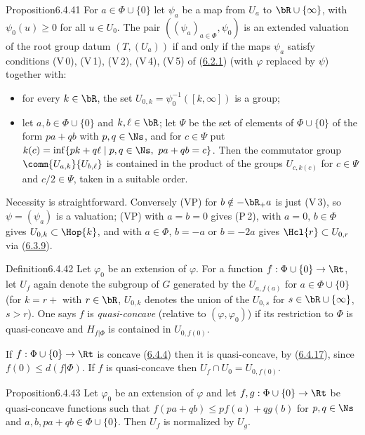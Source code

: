 \documentclass[12pt,a4paper,oneside,english]{smfart}
\makeatletter
\newcommand{\btanchor}[1]{\leavevmode\Hy@raisedlink{\hypertarget{bt:#1}{}}}
\newcommand{\btref}[1]{\hyperlink{bt:#1}{#1}}
\theoremstyle{definition}
\theoremstyle{bt}
\makeatother
\begin{document}
\begin{bt}{Proposition}{6.4.41}\btanchor{6.4.41}
For $a\in\Phi\cup\{0\}$ let $\psi_a$ be a map from $U_a$ to
$\bR\cup\{\infty\}$, with $\psi_0(u)\ge0$ for all $u\in U_0$. The pair
$((\psi_a)_{a\in\Phi},\psi_0)$ is an extended valuation of the root group
datum $(T,(U_a))$ if and only if the maps $\psi_a$ satisfy conditions
(V\,0), (V\,1), (V\,2), (V\,4), (V\,5) of (\btref{6.2.1}) (with $\varphi$
replaced by $\psi$) together with:
\begin{itemize}
\item[(V\,1 bis)] for every $k\in\bR$, the set
  $U_{0,k}=\psi_0^{-1}([k,\infty])$ is a group;
\item[(VP)] let $a,b\in\Phi\cup\{0\}$ and $k,\ell\in\bR$; let $\Psi$ be
  the set of elements of $\Phi\cup\{0\}$ of the form $pa+qb$ with
  $p,q\in\Ns$, and for $c\in\Psi$ put
  $k(c)=\inf\{pk+q\ell\mid p,q\in\Ns,\ pa+qb=c\}$. Then the commutator
  group $\comm{U_{a,k}}{U_{b,\ell}}$ is contained in the product of the
  groups $U_{c,k(c)}$ for $c\in\Psi$ and $c/2\in\Psi$, taken in a
  suitable order.
\end{itemize}
\end{bt}

\begin{sketch}
Necessity is straightforward. Conversely (VP) for $b\notin-\bR_{+}a$ is
just (V\,3), so $\psi=(\psi_a)$ is a valuation; (VP) with $a=b=0$ gives
(P\,2), with $a=0,\,b\in\Phi$ gives $U_{0,k}\subset \Hop{k}$, and with
$a\in\Phi$, $b=-a$ or $b=-2a$ gives $\Hcl{r}\subset U_{0,r}$ via (\btref{6.3.9}).
\end{sketch}

\begin{bt}{Definition}{6.4.42}\btanchor{6.4.42}
Let $\varphi_0$ be an extension of $\varphi$. For a function
$f:\Phi\cup\{0\}\to\Rt$, let $U_f$ again denote the subgroup of $G$
generated by the $U_{a,f(a)}$ for $a\in\Phi\cup\{0\}$ (for $k=r+$ with
$r\in\bR$, $U_{0,k}$ denotes the union of the $U_{0,s}$ for
$s\in\bR\cup\{\infty\}$, $s>r$). One says $f$ is \emph{quasi-concave}
(relative to $(\varphi,\varphi_0)$) if its restriction to $\Phi$ is
quasi-concave and $H_{f|\Phi}$ is contained in $U_{0,f(0)}$.
\end{bt}

\noindent
If $f:\Phi\cup\{0\}\to\Rt$ is concave (\btref{6.4.4}) then it is quasi-concave,
by (\btref{6.4.17}), since $f(0)\le d(f|\Phi)$. If $f$ is quasi-concave then
$U_f\cap U_0=U_{0,f(0)}$.

\begin{bt}{Proposition}{6.4.43}\btanchor{6.4.43}
Let $\varphi_0$ be an extension of $\varphi$ and let
$f,g:\Phi\cup\{0\}\to\Rt$ be quasi-concave functions such that
$f(pa+qb)\le pf(a)+qg(b)$ for $p,q\in\Ns$ and
$a,b,pa+qb\in\Phi\cup\{0\}$. Then $U_f$ is normalized by $U_g$.
\end{bt}
\end{document}
